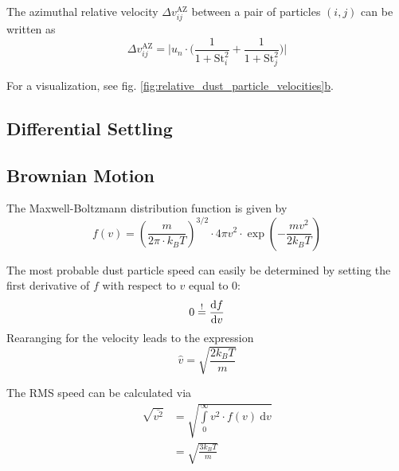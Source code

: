         The azimuthal relative velocity $\Delta v^\text{AZ}_{ij}$ between a pair 
        of particles $(i, j)$ can be written as
        \begin{equation}
            \Delta v^\text{AZ}_{ij}=\bigg|
                u_n\cdot\bigg(
                    \frac{1}{1+\text{St}_i^2}+
                    \frac{1}{1+\text{St}_j^2}
                \bigg)
            \bigg|
        \end{equation}
    
        For a visualization, see fig. 
        \hyperref[fig:relative_dust_particle_velocities]{\ref*{fig:relative_dust_particle_velocities}b}.

    \subsection{Differential Settling}
    \subsection{Brownian Motion}

      The Maxwell-Boltzmann distribution function is given by 
        \begin{equation}
            f(v)
            =\left(\frac{m}{2\pi\cdot k_BT}\right)^{3/2}
            \cdot4\pi v^2\cdot\exp\left(-\frac{mv^2}{2k_BT}\right)
        \end{equation}

        The most probable dust particle speed can easily be determined by 
        setting the first derivative of $f$ with respect to $v$ equal to 0:
        \begin{equation}
            0\overset{!}{=}\frac{\text{d} f}{\text{d} v}
        \end{equation}
        Rearanging for the velocity leads to the expression
        \begin{equation}
            \hat{v}=\sqrt{\frac{2k_BT}{m}}
        \end{equation}

        The RMS speed can be calculated via
        \begin{align}
            \sqrt{\overline{v^2}}
            &=\sqrt{\int\limits_0^\infty v^2\cdot f(v)\ \text{d}v}\\
            &=\sqrt{\frac{3k_BT}{m}}
        \end{align}

